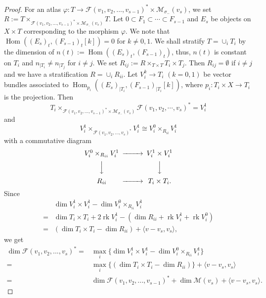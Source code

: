 \documentclass[leqno,11pt]{amsart}
\def\dim{\mathop{\mathrm{dim}}\nolimits}
\def\Hom{\mathop{\mathrm{Hom}}\nolimits}
\def\rk{\mathop{\mathrm{rk}}}
\theoremstyle{definition}
\def\FF{\ensuremath{\mathcal F}}
\def\MM{\ensuremath{\mathcal M}}
\begin{document}
\begin{proof}
For an atlas $\varphi:T \to \FF(v_1,v_2,...,v_{s-1})^* \times \MM_{\sigma_-}(v_s)$,
we set 
$R:=T \times_{\FF(v_1,v_2,...,v_{s-1})^* \times \MM_{\sigma_-}(v_s)} T$.
Let $0 \subset F_1 \subset \cdots \subset F_{s-1}$ and
$E_s$ be objects on $X \times T$ 
corresponding to the morphism $\varphi$. 
We note that $\Hom((E_s)_t,(F_{s-1})_t [k])=0$ for
$k \ne 0,1$.
We shall stratify $T=\cup_i T_i$ by the dimension of  
$n(t):=\Hom((E_s)_t,(F_{s-1})_t)$, thus, 
$n(t)$ is constant on $T_i$
and $n_{|T_i} \ne n_{|T_j}$ for $i \ne j$. 
We set $R_{ij}:=R \times_{T \times T} T_i \times T_j$.
Then $R_{ij}=\emptyset $ if $i \ne j$ and we have a stratification
$R=\cup_i R_{ii}$.
Let $V_i^k \to T_i$ $(k=0,1)$ be vector bundles associated to 
$\Hom_{p_i}((E_s)_{|T_i},(F_{s-1})_{|T_i}[k])$, 
where $p_i:T_i \times X \to T_i$ is the projection.
Then 
$$
T_i \times_{ \FF(v_1,v_2,...,v_{s-1})^* \times \MM_{\sigma_-}(v_s)}
\FF(v_1,v_2,\cdots,v_s)^*=V_i^1
$$
and 
$$
V_i^1 \times_{\FF(v_1,v_2,...,v_s)^*} V_i^1 \cong 
V_i^0 \times_{R_{ii}} V_i^1
$$
with a commutative diagram
\begin{equation}
\begin{CD}
V_i^0 \times_{R_{ii}} V_i^1 @>>> V_i^1 \times V_i^1 \\
@VVV @VVV\\
R_{ii} @>>> T_i \times T_i.
\end{CD}
\end{equation}
%
Since
\begin{equation}
\begin{split}
& \dim V_i^1 \times V_i^1-\dim V_i^0 \times_{R_{ii}} V_i^1\\
=& \dim T_i \times T_i +2\rk V_i^1-(\dim R_{ii}+\rk V_i^1+\rk V_i^0)\\
=& (\dim T_i \times T_i-\dim R_{ii})+\langle v-v_s, v_s \rangle,
\end{split}
\end{equation}
we get 
\begin{equation}
\begin{split}
\dim \FF(v_1,v_2,...,v_s)^* =& 
\max_i \{\dim V_i^1 \times V_i^1-\dim V_i^0 \times_{R_{ii}} V_i^1\}\\
=& \max_i \{(\dim T_i \times T_i-\dim R_{ii})\}+\langle v-v_s, v_s \rangle\\
=&
\dim \FF(v_1,v_2,...,v_{s-1})^*+
\dim \MM(v_s)+\langle v-v_s, v_s \rangle.
\end{split}
\end{equation}
\end{proof}
  
\end{document}
